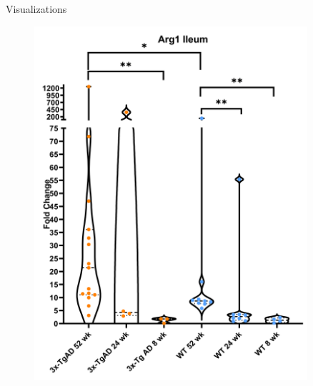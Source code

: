 \documentclass[final]{beamer}
\newlength{\sepwidth}
\newlength{\colwidth}
\newcommand{\separatorcolumn}{\begin{column}{\sepwidth}\end{column}}
\begin{document}
\begin{frame}[t]
\begin{columns}[t]
\begin{column}{\colwidth}
\end{column}

\separatorcolumn

\begin{column}{\colwidth}

  \begin{block}{Visualizations}

    \begin{figure}[!htb]
        \begin{center}
          \includegraphics[width=\linewidth]{assets/arg1_Ileum}
        \end{center}
      \endminipage
        \begin{center}

\end{center}
\end{figure}
\end{block}
\end{column}
\end{columns}
\end{frame}
\end{document}

